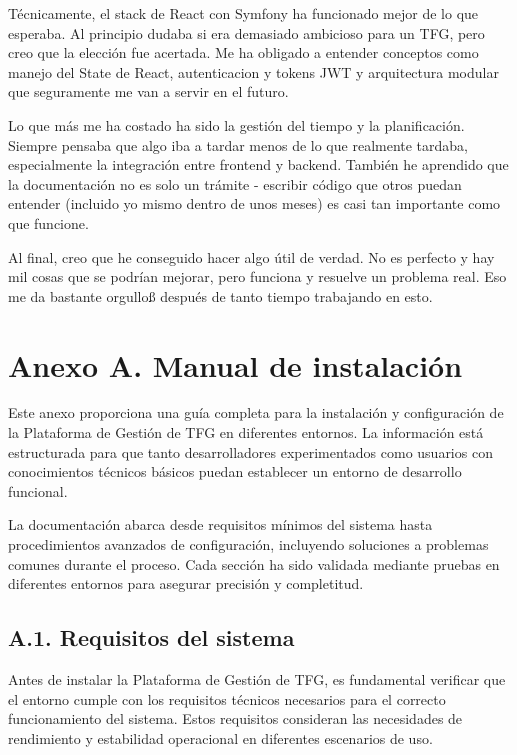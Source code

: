 \documentclass[12pt,a4paper,oneside]{report}
\begin{document}
Técnicamente, el stack de React con Symfony ha funcionado mejor de lo que esperaba. Al principio dudaba si era demasiado ambicioso para un TFG, pero creo que la elección fue acertada. Me ha obligado a entender conceptos como manejo del State de React, autenticacion y tokens JWT y arquitectura modular que seguramente me van a servir en el futuro.

Lo que más me ha costado ha sido la gestión del tiempo y la planificación. Siempre pensaba que algo iba a tardar menos de lo que realmente tardaba, especialmente la integración entre frontend y backend. También he aprendido que la documentación no es solo un trámite - escribir código que otros puedan entender (incluido yo mismo dentro de unos meses) es casi tan importante como que funcione.

Al final, creo que he conseguido hacer algo útil de verdad. No es perfecto y hay mil cosas que se podrían mejorar, pero funciona y resuelve un problema real. Eso me da bastante orgulloß después de tanto tiempo trabajando en esto.

\chapter{Anexo A. Manual de
instalación}\label{anexo-a.-manual-de-instalaciuxf3n}
Este anexo proporciona una guía completa para la instalación y configuración de la Plataforma de Gestión de TFG en diferentes entornos. La información está estructurada para que tanto desarrolladores experimentados como usuarios con conocimientos técnicos básicos puedan establecer un entorno de desarrollo funcional.

La documentación abarca desde requisitos mínimos del sistema hasta procedimientos avanzados de configuración, incluyendo soluciones a problemas comunes durante el proceso. Cada sección ha sido validada mediante pruebas en diferentes entornos para asegurar precisión y completitud.

\section{A.1. Requisitos del sistema}\label{a.1.-requisitos-del-sistema}

Antes de instalar la Plataforma de Gestión de TFG, es fundamental verificar que el entorno cumple con los requisitos técnicos necesarios para el correcto funcionamiento del sistema. Estos requisitos consideran las necesidades de rendimiento y estabilidad operacional en diferentes escenarios de uso.
\end{document}
